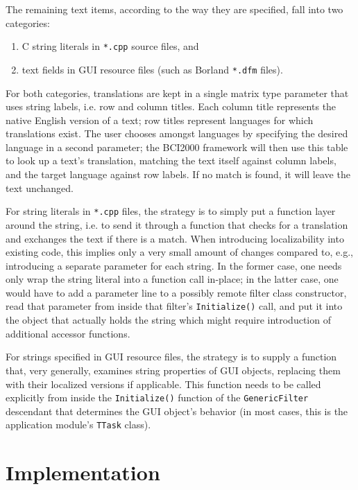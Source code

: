 \documentclass[12pt,a4paper]{article}
\begin{document}
The remaining text items, according to the way they are specified, fall into two categories:
\begin{enumerate}
\item
C string literals in \texttt{*.cpp} source files, and
\item
text fields in GUI resource files (such as Borland \texttt{*.dfm} files).
\end{enumerate}

For both categories, translations are kept in a single matrix type parameter that uses string labels,
i.e. row and column titles.
Each column title represents the native English version of a text; row titles represent
languages for which translations exist. The user chooses amongst languages by specifying
the desired language in a second parameter; the BCI2000 framework will then use this table to look up a text's translation, matching the text itself against column labels, and 
the target language against row labels. If no match is found, it will leave the text unchanged.

For string literals in \texttt{*.cpp} files, the strategy is to simply put a function layer around the string, i.e. to send it through a function that checks for a translation
and exchanges the text if there is a match. When introducing localizability into existing code, this implies only a very small amount of changes compared to, e.g., introducing
a separate parameter for each string. In the former case, one needs only wrap the string literal into a function call in-place; in the latter case, one would have to add a parameter line to a possibly remote filter class constructor, read that parameter from inside that filter's \texttt{Initialize()} call, and put it into the object that actually holds the string which might require introduction of additional accessor functions.

For strings specified in GUI resource files, the strategy is to supply a function that, very generally, examines string properties of GUI objects, replacing them with their localized versions if applicable.
This function needs to be called explicitly from inside the \texttt{Initialize()} function of the \texttt{GenericFilter} descendant that determines the GUI object's behavior (in most cases, this is the application module's \texttt{TTask} class).

\section{Implementation}
\end{document}
